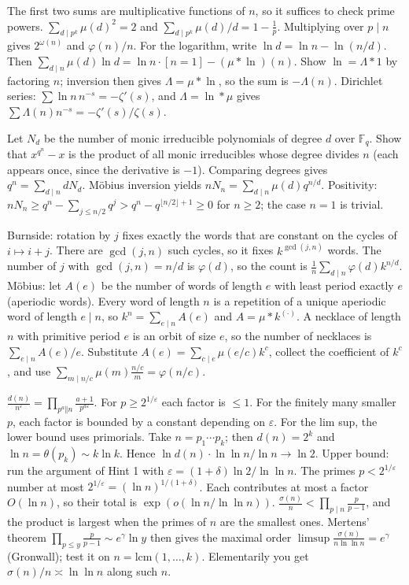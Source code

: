 \documentclass[11pt,a4paper]{article}
\begin{document}

 The first two sums are multiplicative functions of $n$, so it suffices to check prime powers. $\sum_{d\mid p^k}\mu(d)^2=2$ and $\sum_{d\mid p^k}\mu(d)/d=1-\frac1p$. Multiplying over $p\mid n$ gives $2^{\omega(n)}$ and $\varphi(n)/n$.
 For the logarithm, write $\ln d=\ln n-\ln(n/d)$. Then $\sum_{d\mid n}\mu(d)\ln d=\ln n\cdot[n=1]-(\mu*\ln)(n)$. Show $\ln=\Lambda*1$ by factoring $n$; inversion then gives $\Lambda=\mu*\ln$, so the sum is $-\Lambda(n)$.
 Dirichlet series: $\sum\ln n\,n^{-s}=-\zeta'(s)$, and $\Lambda=\ln*\mu$ gives $\sum\Lambda(n)n^{-s}=-\zeta'(s)/\zeta(s)$.

 Let $N_d$ be the number of monic irreducible polynomials of degree $d$ over $\mathbb F_q$. Show that $x^{q^n}-x$ is the product of all monic irreducibles whose degree divides $n$ (each appears once, since the derivative is $-1$).
 Comparing degrees gives $q^n=\sum_{d\mid n}dN_d$. Möbius inversion yields $nN_n=\sum_{d\mid n}\mu(d)q^{n/d}$.
 Positivity: $nN_n\ge q^n-\sum_{j\le n/2}q^j>q^n-q^{\lfloor n/2\rfloor+1}\ge0$ for $n\ge2$; the case $n=1$ is trivial.

 Burnside: rotation by $j$ fixes exactly the words that are constant on the cycles of $i\mapsto i+j$. There are $\gcd(j,n)$ such cycles, so it fixes $k^{\gcd(j,n)}$ words. The number of $j$ with $\gcd(j,n)=n/d$ is $\varphi(d)$, so the count is $\frac1n\sum_{d\mid n}\varphi(d)k^{n/d}$.
 Möbius: let $A(e)$ be the number of words of length $e$ with least period exactly $e$ (aperiodic words). Every word of length $n$ is a repetition of a unique aperiodic word of length $e\mid n$, so $k^n=\sum_{e\mid n}A(e)$ and $A=\mu*k^{(\cdot)}$.
 A necklace of length $n$ with primitive period $e$ is an orbit of size $e$, so the number of necklaces is $\sum_{e\mid n}A(e)/e$. Substitute $A(e)=\sum_{c\mid e}\mu(e/c)k^c$, collect the coefficient of $k^c$, and use $\sum_{m\mid n/c}\mu(m)\frac{n/c}{m}=\varphi(n/c)$.

 $\frac{d(n)}{n^\varepsilon}=\prod_{p^a\Vert n}\frac{a+1}{p^{a\varepsilon}}$. For $p\ge2^{1/\varepsilon}$ each factor is $\le1$. For the finitely many smaller $p$, each factor is bounded by a constant depending on $\varepsilon$.
 For the lim sup, the lower bound uses primorials. Take $n=p_1\cdots p_k$; then $d(n)=2^k$ and $\ln n=\theta(p_k)\sim k\ln k$. Hence $\ln d(n)\cdot\ln\ln n/\ln n\to\ln2$.
 Upper bound: run the argument of Hint 1 with $\varepsilon=(1+\delta)\ln2/\ln\ln n$. The primes $p<2^{1/\varepsilon}$ number at most $2^{1/\varepsilon}=(\ln n)^{1/(1+\delta)}$. Each contributes at most a factor $O(\ln n)$, so their total is $\exp(o(\ln n/\ln\ln n))$.
 $\frac{\sigma(n)}n<\prod_{p\mid n}\frac p{p-1}$, and the product is largest when the primes of $n$ are the smallest ones. Mertens' theorem $\prod_{p\le y}\frac p{p-1}\sim e^\gamma\ln y$ then gives the maximal order $\limsup\frac{\sigma(n)}{n\ln\ln n}=e^\gamma$ (Gronwall); test it on $n=\mathrm{lcm}(1,\dots,k)$. Elementarily you get $\sigma(n)/n\asymp\ln\ln n$ along such $n$.
\end{document}

